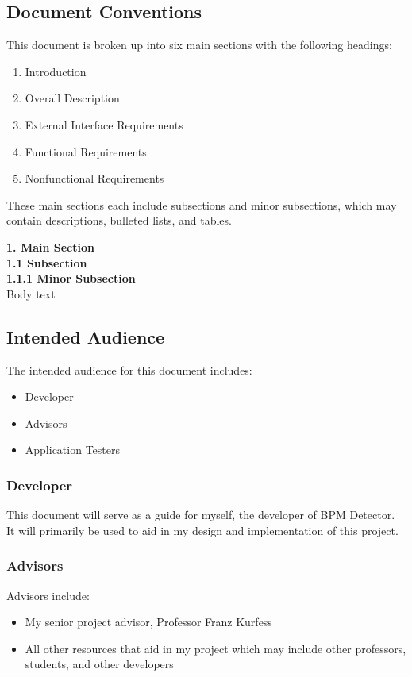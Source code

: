 \documentclass[12pt]{article}
\begin{document}
\subsection{Document Conventions}
This document is broken up into six main sections with the following headings:
\begin{enumerate}
	\item Introduction
    \item Overall Description
    \item External Interface Requirements
    \item Functional Requirements
    \item Nonfunctional Requirements
 \end{enumerate}
 These main sections each include subsections and minor subsections, which may contain descriptions, bulleted lists, and tables.
 
\begin{center}
\Large \textbf{1. Main Section} \\
\large \textbf{1.1 Subsection} \\
\normalsize \textbf{1.1.1 Minor Subsection} \\
\normalsize Body text \\
\end{center}

\subsection{Intended Audience}
The intended audience for this document includes:
\begin{itemize}
	\item Developer
    \item Advisors
    \item Application Testers
 \end{itemize}

\subsubsection{Developer}
This document will serve as a guide for myself, the developer of BPM Detector. It will primarily be used to aid in my design and implementation of this project. 

\subsubsection{Advisors}
Advisors include:
\begin{itemize}
	\item My senior project advisor, Professor Franz Kurfess
    \item All other resources that aid in my project which may include other professors, students, and other developers
 \end{itemize}
\end{document}
